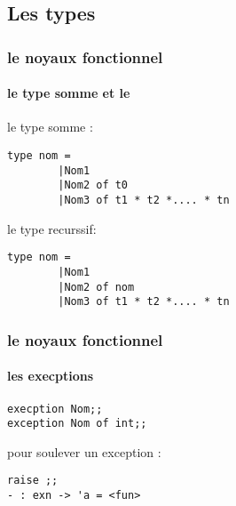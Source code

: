       \subsection{Les types}
\begin{frame}[fragile]
	\frametitle{le noyaux fonctionnel}
	\framesubtitle{le type somme et le }
	le type somme :
	\begin{lstlisting}
type nom =
        |Nom1 
        |Nom2 of t0 
        |Nom3 of t1 * t2 *.... * tn 
	\end{lstlisting}
	le type recurssif:
	\begin{lstlisting}
type nom =
        |Nom1
        |Nom2 of nom
        |Nom3 of t1 * t2 *.... * tn
         \end{lstlisting}
\end{frame}

\begin{frame}[fragile]
  \frametitle{le noyaux fonctionnel}
  \framesubtitle{les execptions}
  \begin{lstlisting}
execption Nom;;
exception Nom of int;;
  \end{lstlisting}
pour soulever un exception : 
\begin{lstlisting}
raise ;;
- : exn -> 'a = <fun>
\end{lstlisting}


\end{frame}
